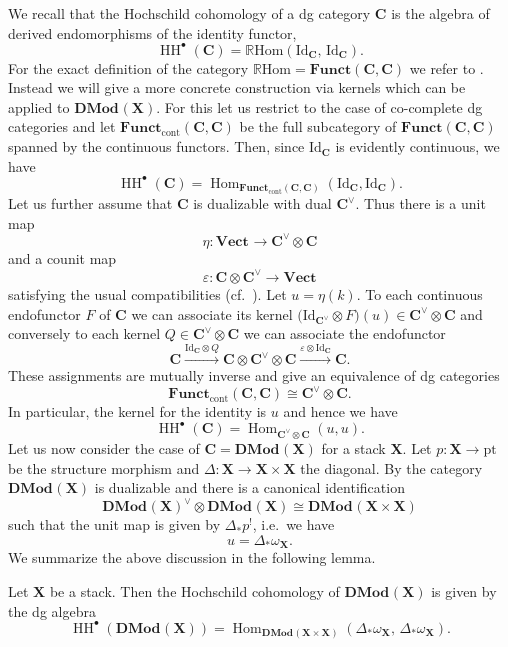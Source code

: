 \documentclass{oupau}
\theoremstyle{remark}
\newcommand\pt{\mathrm{pt}}                 %
\let\stack\mathbf                           %
\newcommand\cat{\mathbf}                    %
\DeclareMathOperator\Hom{Hom}
\newcommand\id[1][]{{\mathrm{Id}_{#1}}}     %
\newcommand\catVect[1][]{\cat{Vect}_{#1}}   %
\newcommand\cx\bullet                       %
\newcommand\dual{∨}
\newcommand{\HCoh}{\operatorname{HH}^\cx}   %
\newcommand\catDMod[2][]{\cat{DMod}_{#1}(#2)}   %
\begin{document}
We recall that the Hochschild cohomology of a dg category $\cat C$ is the algebra of derived endomorphisms of the identity functor,
\[
    \HCoh(\cat C) = \mathbb{R}\mathrm{Hom}(\id[\cat C],\, \id[\cat C]).
\]
For the exact definition of the category $\mathbb{R}\mathrm{Hom} = \cat{Funct}(\cat C, \cat C)$ we refer to \cite{Keller:2006:OnDGCategories}.
Instead we will give a more concrete construction via kernels which can be applied to $\catDMod{\stack X}$.
For this let us restrict to the case of co-complete dg categories and let $\cat{Funct}_{\mathrm{cont}}(\cat C, \cat C)$ be the full subcategory of $\cat{Funct}(\cat C, \cat C)$ spanned by the continuous functors.
Then, since $\id[\cat C]$ is evidently continuous, we have
\[
    \HCoh(\cat C) =
    \Hom_{\cat{Funct}_{\mathrm{cont}}(\cat C, \cat C)}(\id[\cat C], \id[\cat C]).
\]
Let us further assume that $\cat C$ is dualizable with dual $\cat C^\dual$.
Thus there is a unit map
\[
    η\colon \catVect → \cat C^\dual \otimes \cat C
\]
and a counit map
\[
    ε\colon \cat C \otimes \cat C^\dual → \catVect
\]
satisfying the usual compatibilities (cf.~\cite[Section~2]{BenZviNadler:arXiv:NonlinearTraces}).
Let $u = η(k)$.
To each continuous endofunctor $F$ of $\cat C$ we can associate its kernel $\bigl(\id[\cat C^\dual] \otimes F\bigr)(u) ∈ \cat C^\dual \otimes \cat C$ and conversely to each kernel $Q ∈ \cat C^\dual \otimes \cat C$ we can associate the endofunctor
\[
    \cat C
    \xrightarrow{\id[\cat C] \otimes Q}
    \cat C \otimes \cat C^\dual \otimes \cat C
    \xrightarrow{ε \otimes \id[\cat C]}
    \cat C.
\]
These assignments are mutually inverse and give an equivalence of dg categories
\[
    \cat{Funct}_{\mathrm{cont}}(\cat C, \cat C)
    \cong
    \cat C^\dual \otimes \cat C.
\]
In particular, the kernel for the identity is $u$ and hence we have
\[
    \HCoh(\cat C) =
    \Hom_{\cat C^\dual \otimes \cat C}(u, u).
\]
Let us now consider the case of $\cat C = \catDMod{\stack X}$ for a stack $\stack X$.
Let $p\colon \stack X → \pt$ be the structure morphism and $Δ\colon \stack X → \stack X × \stack X$ the diagonal.
By \cite[Section~8.4]{DrinfeldGaitsgory:2013:FinitenessQuestions} the category $\catDMod{\stack X}$ is dualizable and there is a canonical identification
\[
    \catDMod{\stack X}^\dual \otimes \catDMod{\stack X} \cong \catDMod{\stack X × \stack X}
\]
such that the unit map is given by $Δ_*p^!$, i.e.~we have
\[
    u = Δ_*ω_{\stack X}.
\]
We summarize the above discussion in the following lemma.

\begin{lemma}\label{lem:pre:hcoh}
    Let $\stack X$ be a stack.
    Then the Hochschild cohomology of $\catDMod{\stack X}$ is given by the dg algebra
    \[
        \HCoh(\catDMod{\stack X}) =
        \Hom_{\catDMod{\stack X × \stack X}}(Δ_*ω_{\stack X},\, Δ_*ω_{\stack X}).
    \]
\end{lemma}
\end{document}
